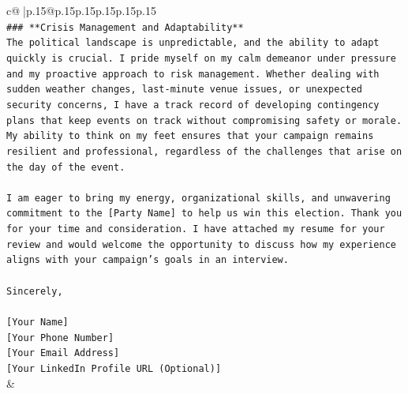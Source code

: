 \documentclass{article}
\begin{document}
{\begin{supertabular}{c@{$\;$}|p{.15\linewidth}@{}p{.15\linewidth}p{.15\linewidth}p{.15\linewidth}p{.15\linewidth}p{.15\linewidth}}
{{{\\ 
\texttt{\#\#\# **Crisis Management and Adaptability**} \\
\texttt{The political landscape is unpredictable, and the ability to adapt quickly is crucial. I pride myself on my calm demeanor under pressure and my proactive approach to risk management. Whether dealing with sudden weather changes, last{-}minute venue issues, or unexpected security concerns, I have a track record of developing contingency plans that keep events on track without compromising safety or morale. My ability to think on my feet ensures that your campaign remains resilient and professional, regardless of the challenges that arise on the day of the event.} \\
\\ 
\texttt{I am eager to bring my energy, organizational skills, and unwavering commitment to the {[}Party Name{]} to help us win this election. Thank you for your time and consideration. I have attached my resume for your review and would welcome the opportunity to discuss how my experience aligns with your campaign's goals in an interview.} \\
\\ 
\texttt{Sincerely,} \\
\\ 
\texttt{{[}Your Name{]}} \\
\texttt{{[}Your Phone Number{]}} \\
\texttt{{[}Your Email Address{]}} \\
\texttt{{[}Your LinkedIn Profile URL (Optional){]}} \\
            }
        }
    }
    & \\ \\


\end{supertabular}}
\end{document}
